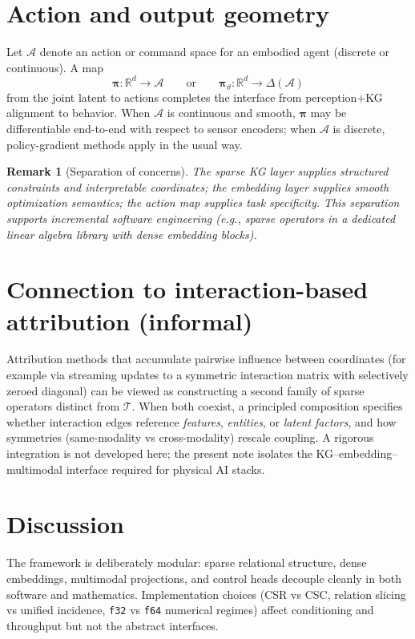 \documentclass[11pt]{article}
\newtheorem{remark}{Remark}
\begin{document}
\section{Action and output geometry}
Let $\mathcal{A}$ denote an action or command space for an embodied agent (discrete or continuous).
A map
\begin{equation}
  \bm{\pi} : \mathbb{R}^d \to \mathcal{A} \qquad \text{or} \qquad \bm{\pi}_\vartheta : \mathbb{R}^d \to \Delta(\mathcal{A})
\end{equation}
from the joint latent to actions completes the interface from perception+KG alignment to behavior.
When $\mathcal{A}$ is continuous and smooth, $\bm{\pi}$ may be differentiable end-to-end with respect to sensor encoders; when $\mathcal{A}$ is discrete, policy-gradient methods apply in the usual way.

\begin{remark}[Separation of concerns]
The sparse KG layer supplies structured constraints and interpretable coordinates; the embedding layer supplies smooth optimization semantics; the action map supplies task specificity.
This separation supports incremental software engineering (e.g., sparse operators in a dedicated linear algebra library with dense embedding blocks).
\end{remark}

\section{Connection to interaction-based attribution (informal)}
Attribution methods that accumulate pairwise influence between coordinates (for example via streaming updates to a symmetric interaction matrix with selectively zeroed diagonal) can be viewed as constructing a second family of sparse operators distinct from $\mathcal{T}$.
When both coexist, a principled composition specifies whether interaction edges reference \emph{features}, \emph{entities}, or \emph{latent factors}, and how symmetries (same-modality vs cross-modality) rescale coupling.
A rigorous integration is not developed here; the present note isolates the KG--embedding--multimodal interface required for physical AI stacks.

\section{Discussion}
The framework is deliberately modular: sparse relational structure, dense embeddings, multimodal projections, and control heads decouple cleanly in both software and mathematics.
Implementation choices (CSR vs CSC, relation slicing vs unified incidence, \texttt{f32} vs \texttt{f64} numerical regimes) affect conditioning and throughput but not the abstract interfaces.
\end{document}
